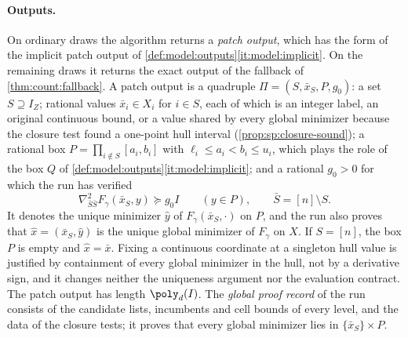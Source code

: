 \paragraph{Outputs.}
On ordinary draws the algorithm returns a \emph{patch output}, which has the
form of the implicit patch output of
\cref{def:model:outputs}\ref{it:model:implicit}. On the remaining draws it returns the exact output of the fallback of
\cref{thm:count:fallback}. A patch output is a quadruple
$\Pi=(S,\bar x_S,P,g_0)$: a set $S\supseteq I_Z$; rational values
$\bar x_i\in X_i$ for $i\in S$, each of which is an integer label, an
original continuous bound, or a value shared by every global minimizer
because the closure test found a one-point hull interval
(\cref{prop:sp:closure-sound}); a rational box
$P=\prod_{i\notin S}[a_i,b_i]$ with $\ell_i\le a_i<b_i\le u_i$, which plays
the role of the box $Q$ of \cref{def:model:outputs}\ref{it:model:implicit};
and a rational $g_0>0$ for which the run has verified
\begin{equation}\label{eq:sp:patch}
 \nabla^2_{\bar S\bar S}F_\gamma(\bar x_S,y)\succeq g_0I
 \qquad(y\in P),\qquad\bar S=[n]\setminus S.
\end{equation}
It denotes the unique minimizer $\hat y$ of $F_\gamma(\bar x_S,\cdot)$ on $P$,
and the run also proves that $\hat x=(\bar x_S,\hat y)$ is the unique global
minimizer of $F_\gamma$ on $X$. If $S=[n]$, the box $P$ is empty and
$\hat x=\bar x$. Fixing a continuous coordinate at a singleton hull value
is justified by containment of every global
minimizer in the hull, not by a derivative sign, and it changes neither the
uniqueness argument nor the evaluation contract. The patch output has length
$\poly_d(I)$. The \emph{global
proof record} of the run consists of the candidate lists, incumbents and
cell bounds of every level, and the data of the closure tests; it proves
that every global minimizer lies in $\{\bar x_S\}\times P$.

